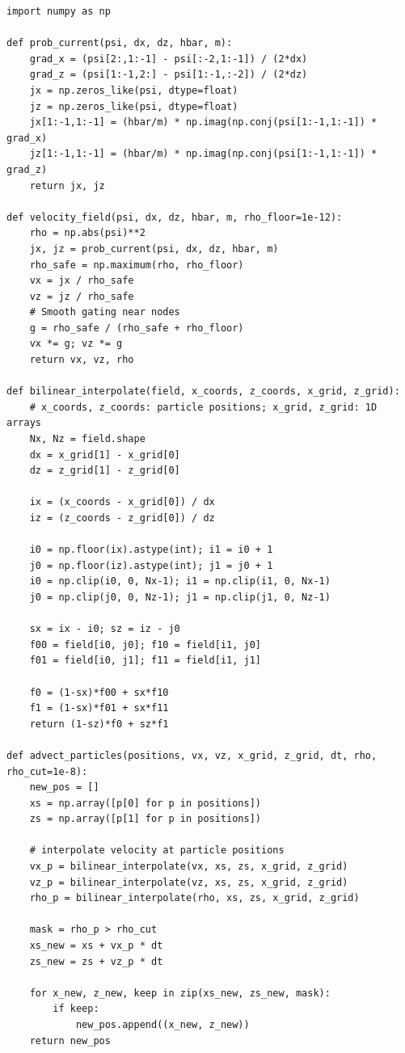 \documentclass[11pt]{article}
\begin{document}
\begin{verbatim}
import numpy as np

def prob_current(psi, dx, dz, hbar, m):
    grad_x = (psi[2:,1:-1] - psi[:-2,1:-1]) / (2*dx)
    grad_z = (psi[1:-1,2:] - psi[1:-1,:-2]) / (2*dz)
    jx = np.zeros_like(psi, dtype=float)
    jz = np.zeros_like(psi, dtype=float)
    jx[1:-1,1:-1] = (hbar/m) * np.imag(np.conj(psi[1:-1,1:-1]) * grad_x)
    jz[1:-1,1:-1] = (hbar/m) * np.imag(np.conj(psi[1:-1,1:-1]) * grad_z)
    return jx, jz

def velocity_field(psi, dx, dz, hbar, m, rho_floor=1e-12):
    rho = np.abs(psi)**2
    jx, jz = prob_current(psi, dx, dz, hbar, m)
    rho_safe = np.maximum(rho, rho_floor)
    vx = jx / rho_safe
    vz = jz / rho_safe
    # Smooth gating near nodes
    g = rho_safe / (rho_safe + rho_floor)
    vx *= g; vz *= g
    return vx, vz, rho

def bilinear_interpolate(field, x_coords, z_coords, x_grid, z_grid):
    # x_coords, z_coords: particle positions; x_grid, z_grid: 1D arrays
    Nx, Nz = field.shape
    dx = x_grid[1] - x_grid[0]
    dz = z_grid[1] - z_grid[0]

    ix = (x_coords - x_grid[0]) / dx
    iz = (z_coords - z_grid[0]) / dz

    i0 = np.floor(ix).astype(int); i1 = i0 + 1
    j0 = np.floor(iz).astype(int); j1 = j0 + 1
    i0 = np.clip(i0, 0, Nx-1); i1 = np.clip(i1, 0, Nx-1)
    j0 = np.clip(j0, 0, Nz-1); j1 = np.clip(j1, 0, Nz-1)

    sx = ix - i0; sz = iz - j0
    f00 = field[i0, j0]; f10 = field[i1, j0]
    f01 = field[i0, j1]; f11 = field[i1, j1]

    f0 = (1-sx)*f00 + sx*f10
    f1 = (1-sx)*f01 + sx*f11
    return (1-sz)*f0 + sz*f1

def advect_particles(positions, vx, vz, x_grid, z_grid, dt, rho, rho_cut=1e-8):
    new_pos = []
    xs = np.array([p[0] for p in positions])
    zs = np.array([p[1] for p in positions])

    # interpolate velocity at particle positions
    vx_p = bilinear_interpolate(vx, xs, zs, x_grid, z_grid)
    vz_p = bilinear_interpolate(vz, xs, zs, x_grid, z_grid)
    rho_p = bilinear_interpolate(rho, xs, zs, x_grid, z_grid)

    mask = rho_p > rho_cut
    xs_new = xs + vx_p * dt
    zs_new = zs + vz_p * dt

    for x_new, z_new, keep in zip(xs_new, zs_new, mask):
        if keep:
            new_pos.append((x_new, z_new))
    return new_pos
\end{verbatim}
\end{document}
